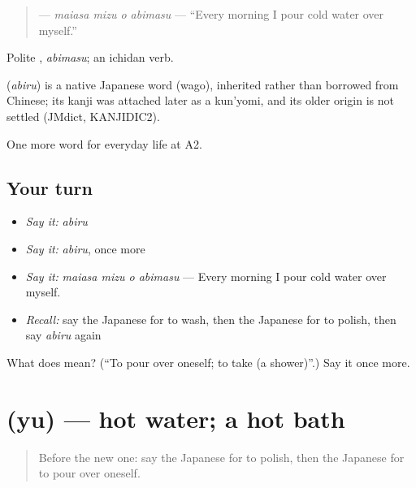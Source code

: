 \begin{quote}
\textbf{  } — \emph{maiasa mizu o abimasu} — \textquotedblleft{}Every morning I pour cold water over myself.\textquotedblright{}
\end{quote}

Polite \textbf{}, \emph{abimasu}; an ichidan verb.

\begin{cousinweb}
\textbf{} (\emph{abiru}) is a native Japanese word (wago), inherited rather than borrowed from Chinese; its kanji was attached later as a kun'yomi, and its older origin is not settled (JMdict, KANJIDIC2).
\end{cousinweb}

\begin{grammarlens}[title={What you've built}]
One more word for everyday life at A2.
\end{grammarlens}

\subsection*{Your turn}
\begin{itemize}
\raggedright
  \item \emph{Say it:} \emph{abiru}
  \item \emph{Say it:} \emph{abiru}, once more
  \item \emph{Say it:} \emph{maiasa mizu o abimasu} — Every morning I pour cold water over myself.
  \item \emph{Recall:} say the Japanese for to wash, then the Japanese for to polish, then say \emph{abiru} again
\end{itemize}

\begin{tcolorbox}[breakable,colback=teal!4,colframe=teal!35!black,title={Before you move on}]
What does  mean? (\textquotedblleft{}To pour over oneself; to take (a shower)\textquotedblright{}.) Say it once more.
\end{tcolorbox}
\section[\texorpdfstring{\ja{ゆ} (yu)}{ゆ (yu)}]{ (yu) — hot water; a hot bath}

\label{lesson:JA-C147-yu}



\begin{quote}
Before the new one: say the Japanese for to polish, then the Japanese for to pour over oneself.
\end{quote}

